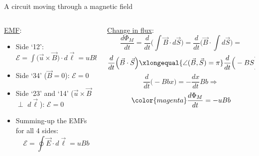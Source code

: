 \begin{frame}{A circuit moving through a magnetic field}
\begin{columns}[t]
  \begin{column}{0.50\textwidth}
  {\scriptsize
    \underline{EMF}:\\
    \vspace{0.1cm}
    \begin{itemize}
       \item Side `12':
             $\mathcal{E} = \int \Big( \vec{u} \times \vec{B} \Big) \cdot d\vec{\ell} = uBb$
       \item Side `34' ($\vec{B}=0$):
             $\mathcal{E} = 0$
       \item Side `23' and `14' ($\vec{u} \times \vec{B}$ $\perp$ $d\vec{\ell}$):
             $\mathcal{E} = 0$
       \item Summing-up the EMFs for all 4 sides:
            {\color{magenta}
              \begin{equation*}
               \mathcal{E} = \oint \vec{E} \cdot d\vec{\ell} = uBb
              \end{equation*}
            }
    \end{itemize}
  }
  \end{column}
  \begin{column}{0.50\textwidth}
  {\scriptsize
    \underline{Change in flux}:\\
    \begin{equation*}
      \frac{d\Phi_{M}}{dt} =
        \frac{d}{dt} \Big( \int \vec{B} \cdot d\vec{S} \Big) =
        \frac{d}{dt} \Big( \vec{B} \cdot \int d\vec{S} \Big) =
    \end{equation*}
    \begin{equation*}
          \frac{d}{dt} \Big( \vec{B} \cdot \vec{S} \Big) \xlongequal{\angle(\vec{B}, \vec{S}) = \pi}
          \frac{d}{dt} \Big( -BS \Big) \xlongequal{S=bx}
    \end{equation*}
    \begin{equation*}
        \frac{d}{dt} \Big( -Bbx \Big) =
        - \frac{dx}{dt} B b \Rightarrow
    \end{equation*}
    \begin{equation*}
        {\color{magenta}
          \frac{d\Phi_{M}}{dt} = -uBb
        }
    \end{equation*}
  }
  \end{column}
\end{columns}

\end{frame}

%
%
%

